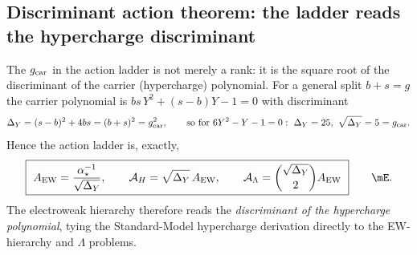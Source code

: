 \subsection{Discriminant action theorem: the ladder reads the hypercharge discriminant}

The $g_{\mathrm{car}}$ in the action ladder is not merely a rank: it is the square root of the discriminant of
the carrier (hypercharge) polynomial. For a general split $b+s=g$ the carrier polynomial is
$bs\,Y^2+(s-b)Y-1=0$ with discriminant
\begin{equation}
  \Delta_Y=(s-b)^2+4bs=(b+s)^2=g_{\mathrm{car}}^2,\qquad\text{so for }6Y^2-Y-1=0:\ \Delta_Y=25,\ \sqrt{\Delta_Y}=5=g_{\mathrm{car}} .
\end{equation}
Hence the action ladder is, exactly,
\begin{equation}
  \boxed{\ \AEW=\frac{\ainv}{\sqrt{\Delta_Y}},\qquad \AH=\sqrt{\Delta_Y}\,\AEW,\qquad
  \AL=\binom{\sqrt{\Delta_Y}}{2}\AEW\ }\qquad\mE .
\end{equation}
The electroweak hierarchy therefore reads the \emph{discriminant of the hypercharge polynomial}, tying
the Standard-Model hypercharge derivation directly to the EW-hierarchy and $\Lambda$ problems.

